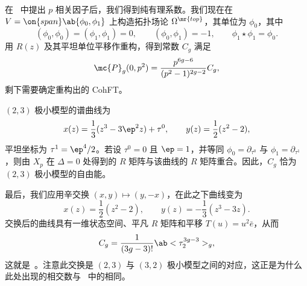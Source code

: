 在~ 中提出 \(p\) 相关因子后，我们得到纯有理系数。我们现在在 \(V = \on{span}\ab\{\phi_0,\phi_1\}\) 上构造拓扑场论 \(\Omega^{\mr{top}}\)，其单位为 \(\phi_0\)，其中
\[ (\phi_0,\phi_0) = (\phi_1,\phi_1) = 0, \qquad (\phi_0,\phi_1) = -1, \qquad \phi_1 \star \phi_1 = \phi_0. \]
用 \(R(z)\) 及其平坦单位平移作重构，得到常数 \(C_g\) 满足
\[ \mc{P}_g(0,p^2) = \frac{p^{6g-6}}{(p^2-1)^{2g-2}}C_g, \]
剩下需要确定重构出的 CohFT。

\((2,3)\) 极小模型的谱曲线为
\[ x(z) = \frac{1}{3}(z^3-3\ep^2 z) + \tau^0, \qquad y(z) = \frac{1}{2}(z^2-2), \]
平坦坐标为 \(\tau^1 = \ep^4/2\)。若设 \(\tau^0 = 0\) 且 \(\ep = 1\)，并等同 \(\phi_0 = \partial_{\tau^0}\) 与 \(\phi_1 = \partial_{\tau^1}\)，则由 \(X_p\) 在 \(\Delta = 0\) 处得到的 \(R\) 矩阵与该曲线的 \(R\) 矩阵重合。因此，\(C_g\) 恰为 \((2,3)\) 极小模型的自由能。

最后，我们应用辛交换 \((x,y) \mapsto (y,-x)\)，在此之下曲线变为
\[ x(z) = \frac{1}{2}(z^2-2), \qquad y(z) = -\frac{1}{3}(z^3-3z). \]
交换后的曲线具有一维状态空间、平凡 \(R\) 矩阵和平移 \(T(u) = u^2 \bar{e}\)，从而
\[ C_g = \frac{1}{(3g-3)!}\ab<\tau_2^{3g-3}>_g, \]
这就是~。注意此交换是 \((2,3)\) 与 \((3,2)\) 极小模型之间的对应，这正是为什么此处出现的相交数与~ 中的相同。

\printbibliography
